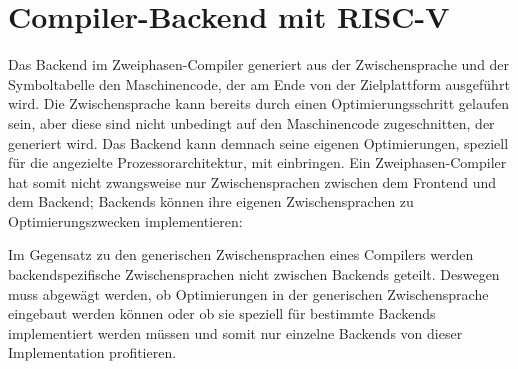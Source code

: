 \chapter{Compiler-Backend mit RISC-V}
\label{chap:theory:risc}

Das Backend im Zweiphasen-Compiler generiert aus der Zwischensprache und der Symboltabelle den Maschinencode, der am Ende von der Zielplattform ausgeführt wird.
Die Zwischensprache kann bereits durch einen Optimierungsschritt gelaufen sein, aber diese sind nicht unbedingt auf den Maschinencode zugeschnitten, der generiert wird.
Das Backend kann demnach seine eigenen Optimierungen, speziell für die angezielte Prozessorarchitektur, mit einbringen.
Ein Zweiphasen-Compiler hat somit nicht zwangsweise nur Zwischensprachen zwischen dem Frontend und dem Backend; Backends können ihre eigenen Zwischensprachen zu Optimierungszwecken implementieren\cite{aho:2006}:

\begin{figure}[H]
\end{figure}

Im Gegensatz zu den generischen Zwischensprachen eines Compilers werden backendspezifische Zwischensprachen nicht zwischen Backends geteilt.
Deswegen muss abgewägt werden, ob Optimierungen in der generischen Zwischensprache eingebaut werden können oder
ob sie speziell für bestimmte Backends implementiert werden müssen und somit nur einzelne Backends von dieser Implementation profitieren.


